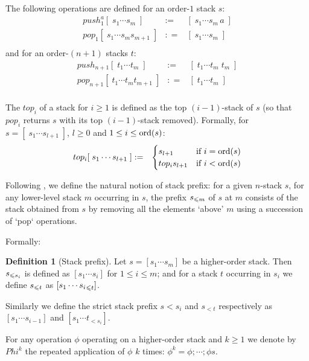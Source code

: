 \documentclass[a4paper,draft]{article}[12pt]
\theoremstyle{remark}
\theoremstyle{definition}
\newtheorem{definition}{Definition}[section]
\begin{document}
The following operations are defined for an order-$1$ stack $s$:
\begin{eqnarray*}
	push_1^{a} [ \; s_1 \cdots s_m \; ] & := & [ \; s_1 \cdots s_m\, a \; ] \\
	pop_1 [ \; s_1 \cdots s_m s_{m+1} \; ] & : = & [ \; s_1 \cdots s_m \; ] \\
\end{eqnarray*}
and for an order-$(n+1)$ stacks $t$:
\begin{eqnarray*}
	push_{n+1} [ \; t_1 \cdots t_m \; ] & := & [ \; t_1 \cdots t_m\; t_m \; ] \\
	pop_{n+1} [ \; t_1 \cdots t_m t_{m+1} \; ] & : = & [ \; t_1 \cdots t_m \; ] \\
\end{eqnarray*}

The $top_i$ of a stack for $i\geq 1$ is defined as the top $(i-1)$-stack of $s$ (so that $pop_i$ returns $s$ with its top $(i-1)$-stack removed).
Formally, for $s=[ \; s_1 \cdots s_{l+1} \; ]$, $l\geq0$ and $1 \leq i\leq \mathop{\mathrm{ord}}(s)$:
\begin{eqnarray*}
	top_{i} [ \; s_1 \cdots s_{l+1} \; ] & := &  
	\begin{cases}
		s_{l+1} & \mbox{if $i = \mathop{\mathrm{ord}}(s)$} \\
		top_i s_{l+1} & \mbox{if $i < \mathop{\mathrm{ord}}(s)$}
	\end{cases}
\end{eqnarray*}


Following \cite{hmos-lics08}, we define the natural notion of stack prefix: for a given $n$-stack $s$, for any lower-level stack $m$ occurring in $s$, the prefix $s_{\leqslant m}$ of $s$ at $m$ consists of the stack obtained from $s$ by removing all the elements `above' $m$ using a succession of `pop` operations. 

Formally:
\begin{definition}[Stack prefix]
Let $s = [s_1 \cdots s_m]$ be a higher-order stack. Then $s_{\leqslant s_i}$ is defined as $[s_1 \cdots s_i]$ for $1 \leq i \leq m$; and for a stack $t$ occurring in $s_i$ we define $s_{\leqslant t}$ as $[s_1 \cdots {s_i}_{\leqslant t}]$.

Similarly we define the strict stack prefix ${s}{< s_i}$ and $s_{<t}$ respectively as
 $[s_1 \cdots s_{i-1}]$ and $[s_1 \cdots t_{< s_{i}}]$.
\end{definition}

For any operation $\phi$ operating on a higher-order stack and $k\geq1$ we denote by $Phi^k$ the repeated application of $\phi$ $k$ times: $\phi^k = \phi ; \cdots; \phi s$.
\end{document}
